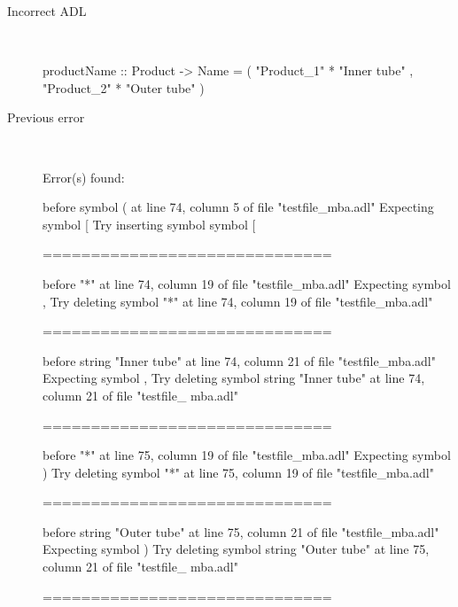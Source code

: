 \begin{description}
  \item[Incorrect ADL]~\\
\begin{adl}
productName :: Product -> Name
  = ( "Product_1" * "Inner tube"
    , "Product_2" * "Outer tube"
    )\end{adl}
  \item[Previous error]~\\
\begin{haskell}
Error(s) found:

before symbol ( at line 74, column 5 of file "testfile_mba.adl"
Expecting symbol [
Try inserting symbol symbol [

==============================

before "*" at line 74, column 19 of file "testfile_mba.adl"
Expecting symbol ,
Try deleting symbol "*" at line 74, column 19 of file "testfile_mba.adl"

==============================

before string "Inner tube" at line 74, column 21 of file "testfile_mba.adl"
Expecting symbol ,
Try deleting symbol string "Inner tube" at line 74, column 21 of file "testfile_
mba.adl"

==============================

before "*" at line 75, column 19 of file "testfile_mba.adl"
Expecting symbol )
Try deleting symbol "*" at line 75, column 19 of file "testfile_mba.adl"

==============================

before string "Outer tube" at line 75, column 21 of file "testfile_mba.adl"
Expecting symbol )
Try deleting symbol string "Outer tube" at line 75, column 21 of file "testfile_
mba.adl"

==============================


\end{haskell}
\end{description}
